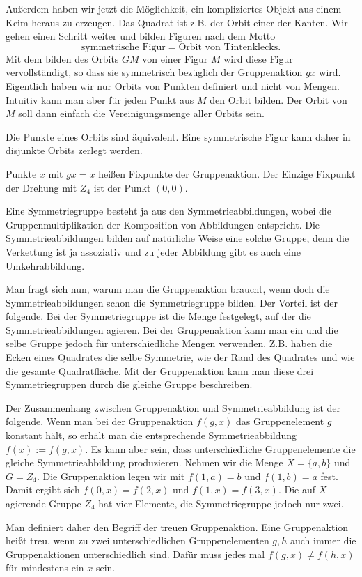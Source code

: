 \documentclass[a4paper,10pt,fleqn,twocolumn,twoside]{article}
\begin{document}
Außerdem haben wir jetzt die Möglichkeit, ein kompliziertes Objekt aus einem Keim heraus zu erzeugen. Das Quadrat ist z.B. der Orbit einer der Kanten. Wir gehen einen Schritt weiter und bilden Figuren nach dem Motto
\[\text{symmetrische Figur} = \text{Orbit von Tintenklecks}.\]
Mit dem bilden des Orbits $GM$ von einer Figur $M$ wird diese Figur vervollständigt, so dass sie symmetrisch bezüglich der Gruppenaktion $gx$ wird. Eigentlich haben wir nur Orbits von Punkten definiert und nicht von Mengen. Intuitiv kann man aber für jeden Punkt aus $M$ den Orbit bilden. Der Orbit von $M$ soll dann einfach die Vereinigungsmenge aller Orbits sein.

Die Punkte eines Orbits sind äquivalent. Eine symmetrische Figur kann daher in disjunkte Orbits zerlegt werden.

Punkte $x$ mit $gx=x$ heißen Fixpunkte der Gruppenaktion. Der Einzige Fixpunkt der Drehung mit $Z_4$ ist der Punkt $(0,0)$.

Eine Symmetriegruppe besteht ja aus den Symmetrieabbildungen, wobei die Gruppenmultiplikation der Komposition von Abbildungen entspricht. Die Symmetrieabbildungen bilden auf natürliche Weise eine solche Gruppe, denn die Verkettung ist ja assoziativ und zu jeder Abbildung gibt es auch eine Umkehrabbildung.

Man fragt sich nun, warum man die Gruppenaktion braucht, wenn doch die Symmetrieabbildungen schon die Symmetriegruppe bilden. Der Vorteil ist der folgende. Bei der Symmetriegruppe ist die Menge festgelegt, auf der die Symmetrieabbildungen agieren. Bei der Gruppenaktion kann man ein und die selbe Gruppe jedoch für unterschiedliche Mengen verwenden. Z.B. haben die Ecken eines Quadrates die selbe Symmetrie, wie der Rand des Quadrates und wie die gesamte Quadratfläche. Mit der Gruppenaktion kann man diese drei Symmetriegruppen durch die gleiche Gruppe beschreiben.

Der Zusammenhang zwischen Gruppenaktion und Symmetrieabbildung ist der folgende. Wenn man bei der Gruppenaktion $f(g,x)$ das Gruppenelement $g$ konstant hält, so erhält man die entsprechende Symmetrieabbildung $f(x):=f(g,x)$. Es kann aber sein, dass unterschiedliche Gruppenelemente die gleiche Symmetrieabbildung produzieren. Nehmen wir die Menge $X=\{a,b\}$ und $G=Z_4$. Die Gruppenaktion legen wir mit $f(1,a)=b$ und $f(1,b)=a$ fest. Damit ergibt sich $f(0,x)=f(2,x)$ und $f(1,x)=f(3,x)$. Die auf $X$ agierende Gruppe $Z_4$ hat vier Elemente, die Symmetriegruppe jedoch nur zwei.

Man definiert daher den Begriff der treuen Gruppenaktion. Eine Gruppenaktion heißt treu, wenn zu zwei unterschiedlichen Gruppenelementen $g,h$ auch immer die Gruppenaktionen unterschiedlich sind. Dafür muss jedes mal $f(g,x)\ne f(h,x)$ für mindestens ein $x$ sein.
\end{document}
